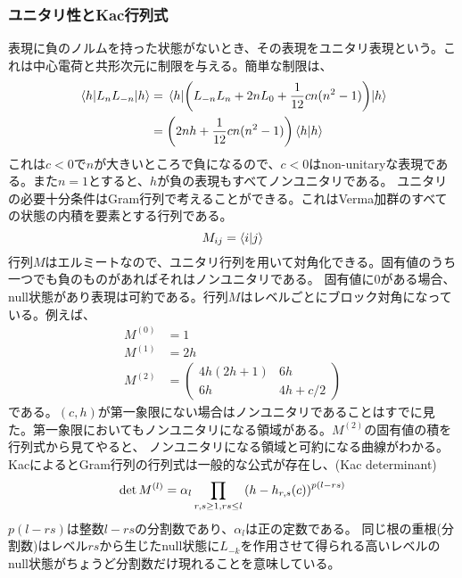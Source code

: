 \documentclass[11pt, aps, longbibliography]{article}
\numberwithin{equation}{section}
\begin{document}
        \subsubsection{ユニタリ性とKac行列式}
        表現に負のノルムを持った状態がないとき、その表現をユニタリ表現という。これは中心電荷と共形次元に制限を与える。簡単な制限は、
        \begin{align}\label{eq:verma3-2}
            \matrixel{h}{L_nL_{-n}}{h} &= \matrixel{h}{\left( L_{-n}L_n + 2nL_0 + \frac{1}{12}cn(n^2-1) \right)}{h}  \notag \\
            &= \left( 2nh+\frac{1}{12}cn(n^2-1)\right)\braket{h}{h}
        \end{align}
        これは$c<0$で$n$が大きいところで負になるので、$c<0$はnon-unitaryな表現である。また$n=1$とすると、$h$が負の表現もすべてノンユニタリである。
        ユニタリの必要十分条件はGram行列で考えることができる。これはVerma加群のすべての状態の内積を要素とする行列である。
        \begin{equation}\label{eq:verma3-3}
            M_{ij} = \braket{i}{j}
        \end{equation}
        行列$M$はエルミートなので、ユニタリ行列を用いて対角化できる。固有値のうち一つでも負のものがあればそれはノンユニタリである。
        固有値に0がある場合、null状態があり表現は可約である。行列$M$はレベルごとにブロック対角になっている。例えば、
        \begin{align}\label{eq:verma3-4}
            M^{(0)} &= 1 \\
            M^{(1)} &= 2h \\
            M^{(2)} &= \begin{pmatrix}
                4h(2h+1) & 6h \\ 6h & 4h + c/2
            \end{pmatrix}
        \end{align}
        である。$(c,h)$が第一象限にない場合はノンユニタリであることはすでに見た。第一象限においてもノンユニタリになる領域がある。$M^{(2)}$の固有値の積を行列式から見てやると、
        ノンユニタリになる領域と可約になる曲線がわかる。KacによるとGram行列の行列式は一般的な公式が存在し、(Kac determinant)
        \begin{equation}\label{eq:verma3-5}
            \det M^{(l)} = \alpha_l \prod_{r,s\geq1, \\ rs \leq l} \left( h-h_{r,s}(c) \right)^{p(l-rs)}
        \end{equation}
        $p(l-rs)$は整数$l-rs$の分割数であり、$\alpha_l$は正の定数である。
        同じ根の重根(分割数)はレベル$rs$から生じたnull状態に$L_{-k}$を作用させて得られる高いレベルのnull状態がちょうど分割数だけ現れることを意味している。
\end{document}
